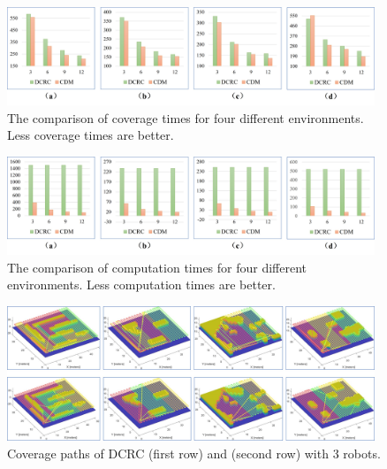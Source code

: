 \documentclass[journal,article,submit,pdftex,moreauthors]{Definitions/mdpi}
\begin{document}
\begin{figure}[htbp] %
	\centering  %
    \vspace{0 cm} %
    \includegraphics[width=0.98\textwidth]{coverage_time.jpg}
    \caption{ The comparison of coverage times for four different environments. Less coverage times are better.}
   \label{Fig_9c}
\end{figure}

\begin{figure}[htbp] %
	\centering  %
    \vspace{0 cm} %
    \includegraphics[width=0.98\textwidth]{computation_time.jpg}
    \caption{  The comparison of computation times for four different environments. Less computation times are better.}
   \label{Fig_9d}
\end{figure}

\begin{figure}[htbp] %
	\centering  %
    \vspace{0 cm} %
    \includegraphics[width=0.98\textwidth]{9a.jpg}
    \caption{ Coverage paths of DCRC (first row) and  (second row) with 3 robots.}
   \label{Fig_9a}
\end{figure}
\end{document}
